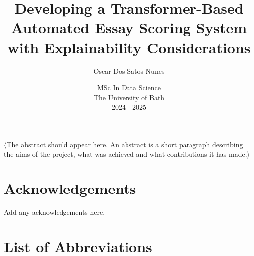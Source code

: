\documentclass[12pt,a4paper]{report}
\title{\bf Developing a Transformer-Based Automated Essay Scoring System with Explainability Considerations}
\author{Oscar Dos Satos Nunes}
\date{MSc In Data Science\\ 
    The University of Bath\\
    2024 - 2025}
\begin{document}
\hypersetup{pageanchor=false}

\lstset{language=Java,breaklines,breakatwhitespace,basicstyle=\small}

\setcounter{page}{0}

\maketitle
\newpage
%

\newpage

\hypersetup{pageanchor=true}

\abstract
$\langle$The abstract should appear here. An abstract is a short paragraph describing the aims of the project, what was achieved and what contributions it has made.$\rangle$
\newpage

\tableofcontents
\newpage

\listoffigures
\newpage

\listoftables
\newpage

\chapter*{Acknowledgements}


Add any acknowledgements here.

\newpage
\setcounter{page}{1}


\chapter*{List of Abbreviations}
\end{document}
